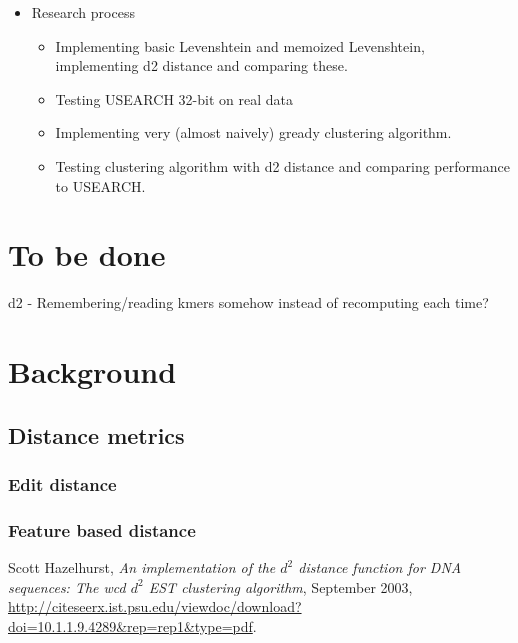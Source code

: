 \documentclass[11pt,a4paper]{article}
\begin{document}
\begin{itemize}
  \item Research process
    \begin{itemize}
      \item Implementing basic Levenshtein and memoized Levenshtein,
        implementing d2 distance and comparing these.
      \item Testing USEARCH 32-bit on real data
      \item Implementing very (almost naively) gready clustering algorithm.
      \item Testing clustering algorithm with d2 distance and comparing
        performance to USEARCH.
    \end{itemize}
\end{itemize}


\section{To be done}
d2 - Remembering/reading kmers somehow instead of recomputing each time?


\section{Background}

\subsection{Distance metrics}

\subsubsection{Edit distance}

\subsubsection{Feature based distance}




\begin{thebibliography}{9}
    Scott Hazelhurst,
    \emph{An implementation of the $d^2$ distance function for DNA
      sequences: The wcd $d^2$ EST clustering algorithm},
      September 2003,
      \url{http://citeseerx.ist.psu.edu/viewdoc/download?doi=10.1.1.9.4289&rep=rep1&type=pdf}.
\end{thebibliography}
\end{document}
